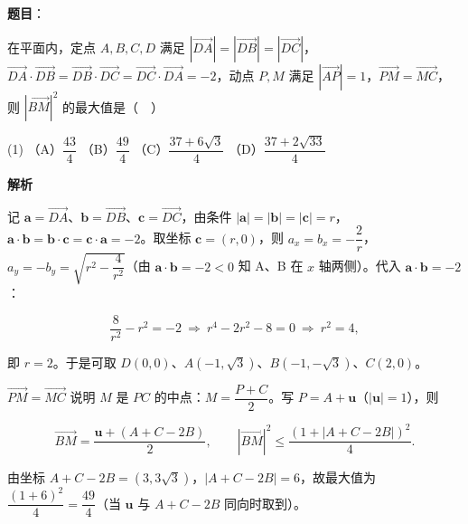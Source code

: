 \begin{answer}

\textbf{题目}：

在平面内，定点 \(A,B,C,D\) 满足 \(\left|\overrightarrow{DA}\right|=\left|\overrightarrow{DB}\right|=\left|\overrightarrow{DC}\right|\)，\(\overrightarrow{DA}\cdot\overrightarrow{DB}=\overrightarrow{DB}\cdot\overrightarrow{DC}=\overrightarrow{DC}\cdot\overrightarrow{DA}=-2\)，动点 \(P,M\) 满足 \(\left|\overrightarrow{AP}\right|=1\)，\(\overrightarrow{PM}=\overrightarrow{MC}\)，则 \(\left|\overrightarrow{BM}\right|^{2}\) 的最大值是（　）

\begin{gkopts}(1)
\task （A）\(\dfrac{43}{4}\)
\task （B）\(\dfrac{49}{4}\)
\task （C）\(\dfrac{37+6\sqrt{3}}{4}\)
\task （D）\(\dfrac{37+2\sqrt{33}}{4}\)
\end{gkopts}

\textbf{解析}

记 \(\boldsymbol a=\overrightarrow{DA}\)、\(\boldsymbol b=\overrightarrow{DB}\)、\(\boldsymbol c=\overrightarrow{DC}\)，由条件 \(|\boldsymbol a|=|\boldsymbol b|=|\boldsymbol c|=r\)，\(\boldsymbol a\cdot\boldsymbol b=\boldsymbol b\cdot\boldsymbol c=\boldsymbol c\cdot\boldsymbol a=-2\)。取坐标 \(\boldsymbol c=(r,0)\)，则 \(a_x=b_x=-\dfrac{2}{r}\)，\(a_y=-b_y=\sqrt{r^{2}-\dfrac{4}{r^{2}}}\)（由 \(\boldsymbol a\cdot\boldsymbol b=-2<0\) 知 A、B 在 \(x\) 轴两侧）。代入 \(\boldsymbol a\cdot\boldsymbol b=-2\)：

\nopagebreak[4]
\[
\frac{8}{r^{2}}-r^{2}=-2\ \Longrightarrow\ r^{4}-2r^{2}-8=0\ \Longrightarrow\ r^{2}=4,
\]

即 \(r=2\)。于是可取 \(D(0,0)\)、\(A(-1,\sqrt{3})\)、\(B(-1,-\sqrt{3})\)、\(C(2,0)\)。

\(\overrightarrow{PM}=\overrightarrow{MC}\) 说明 \(M\) 是 \(PC\) 的中点：\(M=\dfrac{P+C}{2}\)。写 \(P=A+\boldsymbol u\)（\(|\boldsymbol u|=1\)），则

\nopagebreak[4]
\[
\overrightarrow{BM}=\frac{\boldsymbol u+(A+C-2B)}{2},\qquad
\left|\overrightarrow{BM}\right|^{2}\leqslant\frac{(1+|A+C-2B|)^{2}}{4}.
\]

由坐标 \(A+C-2B=(3,3\sqrt{3})\)，\(|A+C-2B|=6\)，故最大值为 \(\dfrac{(1+6)^{2}}{4}=\dfrac{49}{4}\)（当 \(\boldsymbol u\) 与 \(A+C-2B\) 同向时取到）。


\end{answer}
